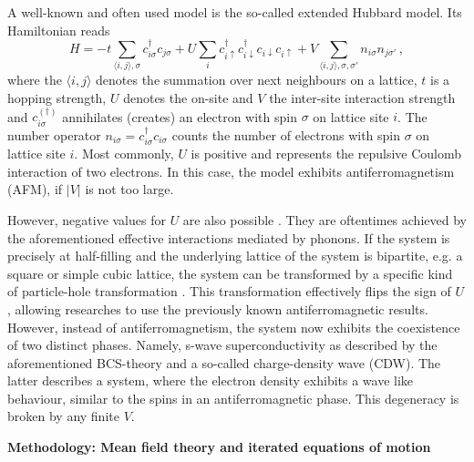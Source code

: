 \documentclass[20pt]{article}
\newcommand{\msection}[1]{ { \vspace{5mm} \hspace{-6mm} \large \textbf{#1}} \vspace{2mm} } %
\begin{document}
A well-known and often used model is the so-called extended Hubbard model. Its Hamiltonian reads
\begin{equation}
    \label{eqn:hubbard}
    H = -t \sum_{\langle i, j \rangle, \sigma} c_{i\sigma}^\dagger c_{j\sigma} 
    + U \sum_i c_{i\uparrow}^\dagger c_{i\downarrow}^\dagger c_{i\downarrow} c_{i\uparrow}
    + V \sum_{\langle i, j \rangle, \sigma, \sigma'} n_{i\sigma}n_{j\sigma'}\,,
\end{equation}
where the $\langle i, j \rangle$ denotes the summation over next neighbours on a lattice, $t$ is a hopping strength, 
$U$ denotes the on-site and $V$ the inter-site interaction strength and $c_{i\sigma}^{(\dagger)}$ annihilates (creates) an electron with spin $\sigma$ on lattice site $i$.
The number operator $n_{i\sigma} = c_{i\sigma}^\dagger c_{i\sigma}$ counts the number of electrons with spin $\sigma$ on lattice site $i$.
Most commonly, $U$ is positive and represents the repulsive Coulomb interaction of two electrons.
In this case, the model exhibits antiferromagnetism (AFM), if $|V|$ is not too large.

However, negative values for $U$ are also possible \cite{sentef}. They are oftentimes achieved by the aforementioned effective interactions mediated by phonons.
If the system is precisely at half-filling and the underlying lattice of the system is bipartite, e.g. a square or simple cubic lattice, 
the system can be transformed by a specific kind of particle-hole transformation \cite{micnas90}.
This transformation effectively flips the sign of $U$, allowing researches to use the previously known antiferromagnetic results.
However, instead of antiferromagnetism, the system now exhibits the coexistence of two distinct phases.
Namely, s-wave superconductivity as described by the aforementioned BCS-theory and a so-called charge-density wave (CDW).
The latter describes a system, where the electron density exhibits a wave like behaviour, similar to the spins in an antiferromagnetic phase.
This degeneracy is broken by any finite $V$.
\newpage

\msection{Methodology: Mean field theory and iterated equations of motion}
\end{document}
